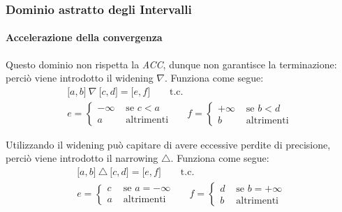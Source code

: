 \documentclass{beamer}
\begin{document}
	\begin{frame}
		\frametitle{Dominio astratto degli Intervalli}
		\framesubtitle{Accelerazione della convergenza}
		Questo dominio non rispetta la \textit{ACC}, dunque non garantisce la terminazione: perciò viene introdotto il \alert{widening $\nabla$}.
		Funziona come segue:
		\begin{align*}
		\lbrack a, b \rbrack\ \nabla\ \lbrack c, d \rbrack = \lbrack e, f \rbrack \qquad \text{t.c.~~~~~~~~~~~~~~~~}\\
		e = 
		\begin{cases}
		-\infty &\text{ se } c < a \\
		a &\text{ altrimenti}
		\end{cases}
		~~~~~~~f = 
		\begin{cases}
		+\infty &\text{ se } b < d\\
		b &\text{ altrimenti }
		\end{cases}
		\end{align*}
		
		\medskip
		Utilizzando il widening può capitare di avere eccessive perdite di precisione, perciò viene introdotto il \alert{narrowing $\triangle$}.
		Funziona come segue:
		\begin{align*}
		\lbrack a, b \rbrack\ \triangle\ \lbrack c, d \rbrack = \lbrack e, f \rbrack \qquad \text{t.c.~~~~~~~~~~~~~~}\\
		e = 
		\begin{cases}
		c &\text{ se } a = -\infty \\
		a &\text{ altrimenti}
		\end{cases}
		~~~~~~~f = 
		\begin{cases}
		d &\text{ se } b = +\infty\\
		b &\text{ altrimenti }
		\end{cases}
		\end{align*}

		\end{frame}
	
\end{document}
